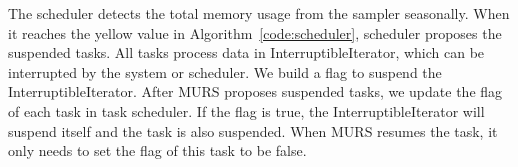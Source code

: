 


The scheduler detects the total memory usage from the sampler seasonally. When it reaches the yellow value in Algorithm~\ref{code:scheduler}, scheduler proposes the suspended tasks. All tasks process data in {\ttfamily \small InterruptibleIterator}, which can be interrupted by the system or scheduler. We build a flag to suspend the {\ttfamily \small InterruptibleIterator}. After MURS proposes suspended tasks, we update the flag of each task in task scheduler. If the flag is true, the {\ttfamily \small InterruptibleIterator} will suspend itself and the task is also suspended. When MURS resumes the task, it only needs to set the flag of this task to be false.


